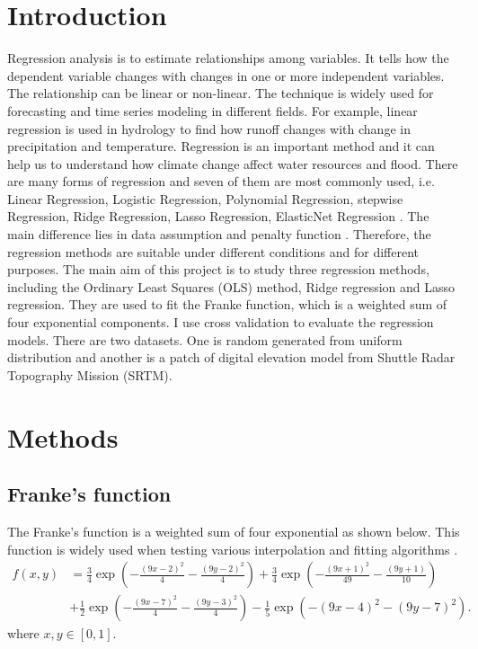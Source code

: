 \documentclass[a4paper]{article}
\begin{document}
\section{Introduction}\label{sec:introduction}
Regression analysis is to estimate relationships among variables. It tells how the dependent variable changes with changes in one or more independent variables. The relationship can be linear or non-linear. The technique is widely used for forecasting and time series modeling in different fields. For example, linear regression is used in hydrology to find  how runoff changes with change in precipitation and temperature. Regression is an important method and it can help us to understand how climate change affect water resources and flood.  
\newline\newline
There are many forms of regression and seven of them are most commonly used, i.e. Linear Regression, Logistic Regression, Polynomial Regression, stepwise Regression, Ridge Regression, Lasso Regression, ElasticNet Regression \cite{Sunil}. The main difference lies in data assumption and penalty function \cite{Aarshay}. Therefore, the regression methods are suitable under different conditions and for different purposes.
\newline\newline
The main aim of this project is to study three regression methods, including the Ordinary Least Squares (OLS) method, Ridge regression and Lasso regression. They are used to fit the Franke function, which is a weighted sum of four exponential components. I use cross validation to evaluate the regression models. There are two datasets. One is random generated from uniform distribution and another is a patch of digital elevation model from Shuttle Radar Topography Mission (SRTM). 
\section{Methods}\label{sec:methods}
\subsection{Franke's function}
The Franke's function is a weighted sum of four exponential as shown below. This function is widely used when testing various  interpolation and fitting algorithms \cite{Hjorth_Jensen}.
\begin{align*}
f(x,y) &= \frac{3}{4}\exp{\left(-\frac{(9x-2)^2}{4} - \frac{(9y-2)^2}{4}\right)}+\frac{3}{4}\exp{\left(-\frac{(9x+1)^2}{49}- \frac{(9y+1)}{10}\right)} \\
&+\frac{1}{2}\exp{\left(-\frac{(9x-7)^2}{4} - \frac{(9y-3)^2}{4}\right)} -\frac{1}{5}\exp{\left(-(9x-4)^2 - (9y-7)^2\right) }.
\end{align*}
where $x,y\in [0,1]$.
\end{document}
